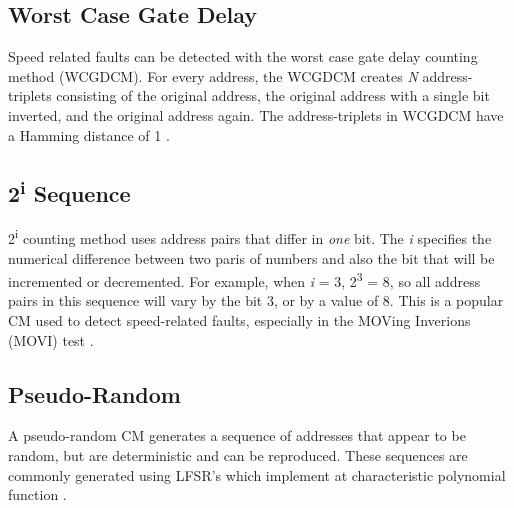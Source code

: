 \subsection{Worst Case Gate Delay}
Speed related faults can be detected with the worst case gate delay counting method (WCGDCM).  For every address, the WCGDCM creates \textit{N} address-triplets consisting of the original address, the original address with a single bit inverted, and the original address again.  The address-triplets in WCGDCM have a Hamming distance of 1 \cite{5359299}.

\subsection{2\textsuperscript{i} Sequence}
2\textsuperscript{i} counting method uses address pairs that differ in \textit{one} bit.  The \textit{i} specifies the numerical difference between two paris of numbers and also the bit that will be incremented or decremented.  For example, when \textit{i} = 3, 2\textsuperscript{3} = 8, so all address pairs in this sequence will vary by the bit 3, or by a value of 8.  This is a popular CM used to detect speed-related faults, especially in the MOVing Inverions (MOVI) test \cite{5941430}.

\subsection{Pseudo-Random}
A pseudo-random CM generates a sequence of addresses that appear to be random, but are deterministic and can be reproduced.  These sequences are commonly generated using LFSR's which implement at characteristic polynomial function \cite{VanDeGoor1991}.


